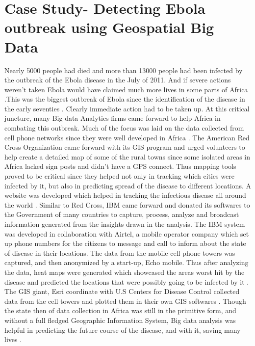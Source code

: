 \section{Case Study- Detecting Ebola outbreak using Geospatial Big Data}
Nearly 5000 people had died and more than 13000 people had been infected by the outbreak of the Ebola disease in the July of 2011. And if severe actions weren't taken Ebola would have claimed much more lives in some parts of Africa \cite{link11}.This was the biggest outbreak of Ebola since the identification of the disease in the early seventies \cite{link11}. Clearly immediate action had to be taken up. At this critical juncture, many Big data Analytics firms came forward to help Africa in combating this outbreak. Much of the focus was laid on the data collected from cell phone networks since they were well developed in Africa \cite{link12}. The American Red Cross Organization came forward with its GIS program and urged volunteers to help create a detailed map of some of the rural towns since some isolated areas in Africa lacked sign posts and didn't have a GPS connect. Thus mapping tools proved to be critical since they helped not only in tracking which cities were infected by it, but also in predicting spread of the disease to different locations. A website was developed which helped in tracking the infectious disease all around the world \cite{link11}.
Similar to Red Cross, IBM came forward and donated its softwares to the Government of many countries to capture, process, analyze and broadcast information generated from the insights drawn in the analysis. The IBM system was developed in collaboration with Airtel, a mobile operator company which set up phone numbers for the citizens to message and call to inform about the state of disease in their locations. The data from the mobile cell phone towers was captured, and then anonymized by a start-up, Echo mobile. Thus after analyzing the data, heat maps were generated which showcased the areas worst hit by the disease and predicted the locations that were possibly going to be infected by it \cite{link11}.
The GIS giant, Esri coordinate with U.S Centers for Disease Control collected data from the cell towers and plotted them in their own GIS softwares \cite{link11}.
Though the state then of data collection in Africa was still in the primitive form, and without a full fledged Geographic Information System, Big data analysis was helpful in predicting the future course of the disease, and with it, saving many lives \cite{link12}.


